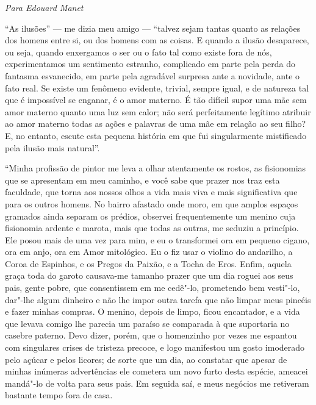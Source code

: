 \begin{flushright}
\textit{Para Edouard Manet}
\end{flushright}

“As ilusões'' --- me dizia meu amigo --- “talvez sejam
tantas quanto as relações dos homens entre si, ou dos homens com as
coisas. E quando a ilusão desaparece, ou seja, quando enxergamos o ser
ou o fato tal como existe fora de nós, experimentamos um sentimento
estranho, complicado em parte pela perda do fantasma esvanecido, em
parte pela agradável surpresa ante a novidade, ante o fato real.
Se existe um fenômeno evidente, trivial, sempre igual, e de natureza
tal que é impossível se enganar, é o amor materno. É tão difícil supor
uma mãe sem amor materno quanto uma luz sem calor; não será
perfeitamente legítimo atribuir ao amor materno todas as ações e
palavras de uma mãe em relação ao seu filho? E, no entanto, escute esta
pequena história em que fui singularmente mistificado pela ilusão mais
natural''.

“Minha profissão de pintor me leva a olhar atentamente os
rostos, as fisionomias que se apresentam em meu caminho, e você sabe que
prazer nos traz esta faculdade, que torna aos nossos olhos a vida mais
viva e mais significativa que para os outros homens. No bairro afastado
onde moro, em que amplos espaços gramados ainda separam os prédios,
observei frequentemente um menino cuja fisionomia ardente e marota,
mais que todas as outras, me seduziu a princípio. Ele posou mais de
uma vez para mim, e eu o  transformei ora em pequeno cigano, ora em
anjo, ora em Amor mitológico. Eu o fiz usar o violino do andarilho, a
Coroa de Espinhos, e os Pregos da Paixão, e a Tocha de Eros. Enfim,
aquela graça toda do garoto causava-me tamanho prazer que 
um dia roguei aos seus pais, gente pobre, que consentissem em me cedê"-lo,
prometendo bem vesti"-lo, dar"-lhe algum dinheiro e não lhe impor 
outra tarefa que não limpar meus pincéis e fazer minhas compras. O
menino, depois de limpo, ficou encantador, e a vida que levava
comigo lhe parecia um paraíso se comparada à que suportaria no casebre
paterno. Devo dizer, porém, que o homenzinho por vezes me espantou com
singulares crises de tristeza precoce, e logo manifestou um gosto
imoderado pelo açúcar e pelos licores; de sorte que um dia, ao constatar que apesar de minhas inúmeras advertências ele cometera
um novo furto desta espécie, ameacei mandá"-lo de volta para seus pais.
Em seguida saí, e meus negócios me retiveram bastante tempo fora de
casa.

